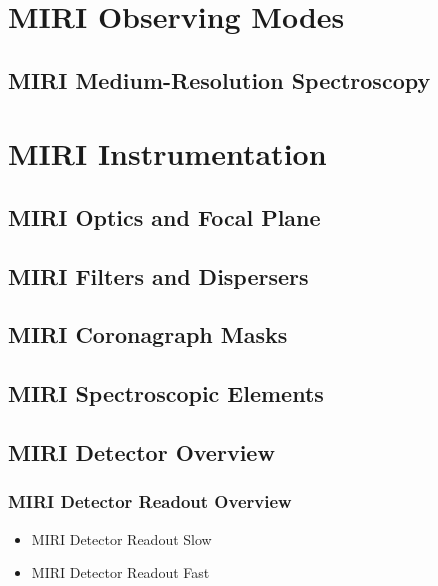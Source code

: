 \section{MIRI Observing Modes}
    \subsection{MIRI Medium-Resolution Spectroscopy}
    
\section{MIRI Instrumentation}
    \subsection{MIRI Optics and Focal Plane}
    \subsection{MIRI Filters and Dispersers}
    \subsection{MIRI Coronagraph Masks}
    \subsection{MIRI Spectroscopic Elements}
    \subsection{MIRI Detector Overview}
        \subsubsection{MIRI Detector Readout Overview}
          \begin{itemize}
            \item{MIRI Detector Readout Slow}
            \item{MIRI Detector Readout Fast}
          \end{itemize}
